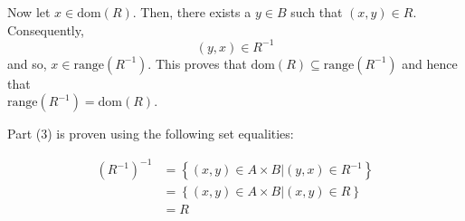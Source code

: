 \begin{enumerate}
\begin{myproof}
Now let $x \in \text{dom}\left( R \right)$.  Then, there exists a  $y \in B$ such that  
$\left( {x, y} \right) \in R$.  Consequently,  
\[
\left( {y, x} \right) \in R^{ - 1} 
\]
and so, $x \in \text{range}\left( {R^{ - 1} } \right)$.  This proves that  
$\text{dom}\left( R \right) \subseteq \text{range}\left( {R^{ - 1} } \right)$ and hence that \\ $\text{range}\left( {R^{ - 1} } \right) = \text{dom}\left( R \right)$.
\vskip6pt

Part (3) is proven using the following set equalities:

\[
\begin{aligned}
\left( {R^{ - 1} } \right)^{ - 1}  &= \left\{ {\left. {\left( {x, y} \right) \in A \times B} \right| \left( {y, x} \right) \in R^{ - 1} } \right\} \\ 
                                   &= \left\{ {\left. {\left( {x, y} \right) \in A \times B} \right| \left( {x, y} \right) \in R} \right\} \\ 
                                   &= R  \\
\end{aligned} 
\]
\end{myproof}

\end{enumerate}
\hbreak

\endinput
